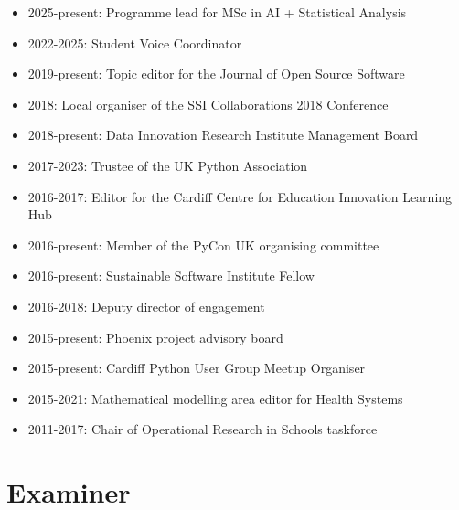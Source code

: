 \documentclass[10pt]{article}
\begin{document}
\begin{itemize}

  \item 2025-present: Programme lead for MSc in AI + Statistical Analysis

  \item 2022-2025: Student Voice Coordinator

  \item 2019-present: Topic editor for the Journal of Open Source Software

  \item 2018: Local organiser of the SSI Collaborations 2018 Conference

  \item 2018-present: Data Innovation Research Institute Management Board

  \item 2017-2023: Trustee of the UK Python Association

  \item 2016-2017: Editor for the Cardiff Centre for Education Innovation Learning Hub

  \item 2016-present: Member of the PyCon UK organising committee

  \item 2016-present: Sustainable Software Institute Fellow

  \item 2016-2018: Deputy director of engagement

  \item 2015-present: Phoenix project advisory board

  \item 2015-present: Cardiff Python User Group Meetup Organiser

  \item 2015-2021: Mathematical modelling area editor for Health Systems

  \item 2011-2017: Chair of Operational Research in Schools taskforce

\end{itemize}

\section{Examiner}
\end{document}
